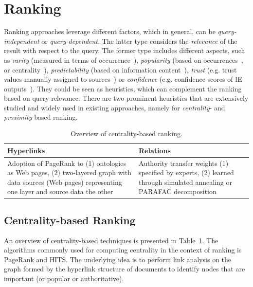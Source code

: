 	
\section{Ranking}\label{sec:ranking}
Ranking approaches leverage different factors, which in general, can be \emph{query-independent} or \emph{query-dependent}. The latter type considers the \emph{relevance} of the result with respect to the query. The former type includes different aspects, such as \emph{rarity} (measured in terms of occurrence~\cite{DBLP:journals/internet/Aleman-MezaHARS05}), \emph{popularity} (based on occurrences~\cite{DBLP:conf/icde/TranWRC09}, or centrality~\cite{DBLP:journals/internet/Aleman-MezaHARS05}), \emph{predictability} (based on information content~\cite{DBLP:conf/www/AnyanwuMS05}), \emph{trust} (e.g. trust values manually assigned to sources~\cite{DBLP:journals/internet/Aleman-MezaHARS05}) or \emph{confidence} (e.g. confidence scores of IE outputs~\cite{DBLP:conf/www/NieZWM05,DBLP:conf/vldb/ChengYC07}). They could be seen as heuristics, which can complement the ranking based on query-relevance. There are two prominent heuristics that are extensively studied and widely used in existing approaches, namely for \emph{centrality}- and \emph{proximity}-based ranking. 

\begin{table}[htbp]
  \centering
  \caption{Overview of centrality-based ranking.}
    \begin{tabular}{|p{3.7cm}|p{3.4cm}|}
    \hline
    \textbf{Hyperlinks} & \textbf{Relations}  \bigstrut\\
    \hline
    \hline
    Adoption of PageRank to (1) ontologies as Web pages, (2) two-layered graph with data sources (Web pages) representing one layer and source data the other & Authority transfer weights (1) specified by experts, (2) learned through simulated annealing or PARAFAC decomposition \bigstrut\\
    \hline
    \end{tabular}%
  \label{tab:centrality}%
  \vspace{-0.5cm}
\end{table}%


\subsection{Centrality-based Ranking} An overview of centrality-based techniques is presented in Table~\ref{tab:centrality}. The algorithms commonly used for computing centrality in the context of ranking is PageRank and HITS. The underlying idea is to perform link analysis on the graph formed by the hyperlink structure of documents to identify nodes that are important (or popular or authoritative). 

